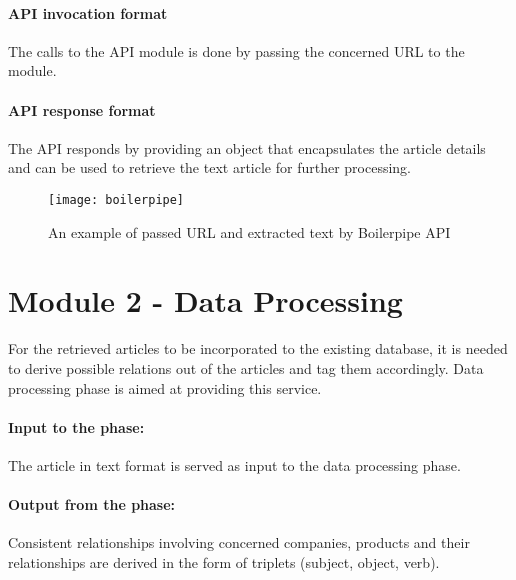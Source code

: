 \paragraph*{API invocation format}
\hfill
\par The calls to the API module is done by passing the concerned URL to the module.
\paragraph*{API response format}
\hfill \break
The API responds by providing an object that encapsulates the article details and can be used to retrieve the text article for further processing.
\begin{figure}[h]
	\texttt{[image: boilerpipe]}
	\centering
	\caption{An example of passed URL and extracted text by Boilerpipe API}
\end{figure}

\section{Module 2 - Data Processing}
\par
For the retrieved articles to be incorporated to the existing database, it is needed to derive possible relations out of the articles and tag them accordingly. Data processing phase is aimed at providing this service. 
\paragraph*{Input to the phase:}
The article in text format is served as input to the data processing phase.
\paragraph*{Output from the phase:}
Consistent relationships involving concerned companies, products and their relationships are derived in the form of triplets (subject, object, verb).

